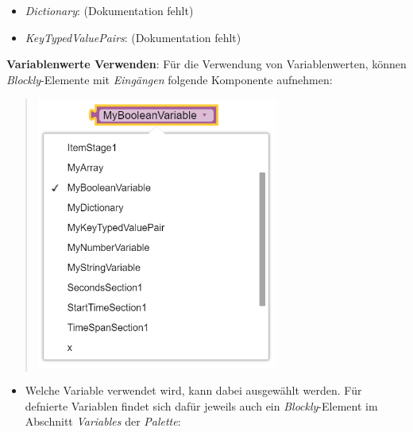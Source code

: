 \documentclass[
  letterpaper,
  DIV=11]{scrreprt}
\providecommand{\tightlist}{%
  \setlength{\itemsep}{0pt}\setlength{\parskip}{0pt}}\usepackage{longtable,booktabs,array}
\begin{document}
\begin{tcolorbox}
\begin{itemize}
\item
  \emph{Dictionary}: (Dokumentation fehlt)
\item
  \emph{KeyTypedValuePairs}: (Dokumentation fehlt)
\end{itemize}

\textbf{Variablenwerte Verwenden}: Für die Verwendung von
Variablenwerten, können \emph{Blockly}-Elemente mit \emph{Eingängen}
folgende Komponente aufnehmen:

\begin{quote}
\includegraphics[width=3.125in,height=\textheight]{img/screenshot-blockly-variable-example-dropdownlist-01-DEU.png}
\end{quote}

\begin{itemize}
\tightlist
\item
  Welche Variable verwendet wird, kann dabei ausgewählt werden. Für
  defnierte Variablen findet sich dafür jeweils auch ein
  \emph{Blockly}-Element im Abschnitt \emph{Variables} der
  \emph{Palette}:
\end{itemize}


\end{tcolorbox}
\end{document}
